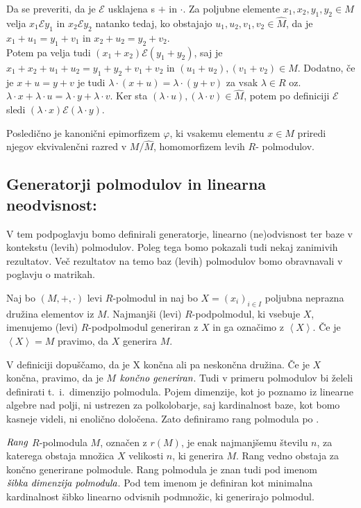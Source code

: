 \documentclass[mat1]{fmfdelo}
\newcommand{\pojem}[1]{\ensuremath{\emph{#1}}}
\newcommand{\Gen}[1]{\ensuremath{\left<{#1}\right>}}
\begin{document}
Da se preveriti, da je $\mathcal{E}$ usklajena s $+$ in $\cdot$. Za poljubne elemente $x_1, x_2, y_1, y_2 \in M$ velja $x_1\mathcal{E}y_1$ in $x_2\mathcal{E}y_2$ natanko tedaj, ko obstajajo $u_1, u_2, v_1, v_2 \in \widehat{M}$, da je $x_1 + u_1 = y_1 + v_1$ in $ x_2 + u_2 = y_2 + v_2$. \\

Potem pa velja tudi $(x_1 + x_2)\mathcal{E}(y_1 + y_2)$, saj je $x_1 + x_2 + u_1 + u_2 = y_1 + y_2 + v_1 + v_2$ in $(u_1 + u_2), (v_1 + v_2)\in \widehat{M}$. Dodatno, če je $x + u = y + v$ je tudi $\lambda\cdot (x + u) = \lambda\cdot (y + v)$ za vsak $\lambda\in R$ oz. $\lambda\cdot x + \lambda\cdot u = \lambda\cdot y + \lambda\cdot v$. Ker sta $(\lambda\cdot u), (\lambda\cdot v)\in \widehat{M}$, potem po definiciji $\mathcal{E}$ sledi $(\lambda\cdot x) \mathcal{E} (\lambda\cdot y)$.

Posledično je kanonični epimorfizem $\varphi$, ki vsakemu elementu $x\in M$ priredi njegov ekvivalenčni razred v $M/\widehat{M}$, homomorfizem levih $R$- polmodulov.

\subsection{Generatorji polmodulov in linearna neodvisnost:}
V tem podpoglavju bomo definirali generatorje, linearno (ne)odvisnost ter baze v kontekstu (levih) polmodulov. Poleg tega bomo pokazali tudi nekaj zanimivih rezultatov. Več rezultatov na temo baz (levih) polmodulov bomo obravnavali v poglavju o matrikah.
\begin{definicija}
	Naj bo $(M, +, \cdot)$ levi $R$-polmodul in naj bo $X = (x_i)_{i\in I}$ poljubna neprazna družina elementov iz $M$. Najmanjši (levi) $R$-podpolmodul, ki vsebuje $X$, imenujemo (levi) $R$-podpolmodul generiran z $X$ in ga označimo z \Gen{X}. Če je $\Gen{X} = M$ pravimo, da $X$ generira $M$.
\end{definicija}

	V definiciji dopuščamo, da je X končna ali pa neskončna družina. Če je $X$ končna, pravimo, da je $M$ \pojem{končno generiran}. Tudi v primeru polmodulov bi želeli definirati t.~i.\ dimenzijo polmodula. Pojem dimenzije, kot jo poznamo iz linearne algebre nad polji, ni ustrezen za polkolobarje, saj kardinalnost baze, kot bomo kasneje videli, ni enolično določena. Zato definiramo rang polmodula po \cite[str. 3--4]{bib:Tanbase}.

\begin{definicija}
	\pojem{Rang} $R$-polmodula $M$, označen z $r(M)$, je enak najmanjšemu številu $n$, za katerega obstaja množica $X$ velikosti $n$, ki generira $M$. Rang vedno obstaja za končno generirane polmodule. Rang polmodula je znan tudi pod imenom \pojem{šibka dimenzija polmodula}. Pod tem imenom je definiran kot minimalna kardinalnost šibko linearno odvisnih podmnožic, ki generirajo polmodul.
\end{definicija}
\end{document}
